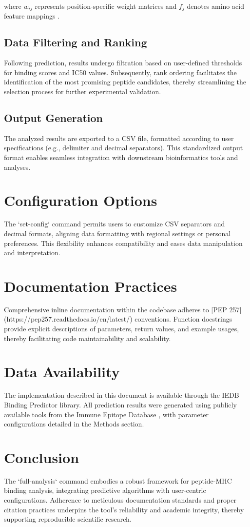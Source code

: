 \documentclass{article}
\begin{document}
where $w_{ij}$ represents position-specific weight matrices and $f_j$ denotes amino acid feature mappings \citep{andreatta2016netmhcpan}.

\subsection{Data Filtering and Ranking}
Following prediction, results undergo filtration based on user-defined thresholds for binding scores and IC50 values. Subsequently, rank ordering facilitates the identification of the most promising peptide candidates, thereby streamlining the selection process for further experimental validation.

\subsection{Output Generation}
The analyzed results are exported to a CSV file, formatted according to user specifications (e.g., delimiter and decimal separators). This standardized output format enables seamless integration with downstream bioinformatics tools and analyses.

\section{Configuration Options}
The `set-config` command permits users to customize CSV separators and decimal formats, aligning data formatting with regional settings or personal preferences. This flexibility enhances compatibility and eases data manipulation and interpretation.

\section{Documentation Practices}
Comprehensive inline documentation within the codebase adheres to [PEP 257] (https://pep257.readthedocs.io/en/latest/) conventions. Function docstrings provide explicit descriptions of parameters, return values, and example usages, thereby facilitating code maintainability and scalability.

\section*{Data Availability}
The implementation described in this document is available through the IEDB Binding Predictor library. All prediction results were generated using publicly available tools from the Immune Epitope Database \citep{reynisson2020netmhcpan}, with parameter configurations detailed in the Methods section.

\section{Conclusion}
The `full-analysis` command embodies a robust framework for peptide-MHC binding analysis, integrating predictive algorithms with user-centric configurations. Adherence to meticulous documentation standards and proper citation practices underpins the tool's reliability and academic integrity, thereby supporting reproducible scientific research.



\end{document}
